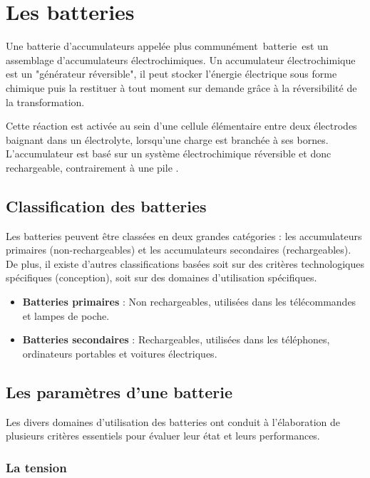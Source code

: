 \section{Les batteries}
Une batterie d'accumulateurs appelée plus communément batterie est un assemblage d'accumulateurs électrochimiques.
Un accumulateur électrochimique est un "générateur réversible", il peut stocker l'énergie électrique sous forme chimique puis la restituer à tout moment sur demande grâce à la réversibilité de la transformation.

Cette réaction est activée au sein d'une cellule élémentaire entre deux électrodes baignant dans un électrolyte, lorsqu'une charge est branchée à ses bornes.
L'accumulateur est basé sur un système électrochimique réversible et donc rechargeable, contrairement à une pile  .\\

\subsection{Classification des batteries}
Les batteries peuvent être classées en deux grandes catégories : les accumulateurs primaires (non-rechargeables) et les accumulateurs secondaires (rechargeables)\cite{l1}. De plus, il existe d'autres classifications basées soit sur des critères technologiques spécifiques (conception), soit sur des domaines d'utilisation spécifiques.

\begin{itemize}
	\item \textbf{Batteries primaires} : Non rechargeables, utilisées dans les télécommandes et lampes de poche.
	\item \textbf{Batteries secondaires} : Rechargeables, utilisées dans les téléphones, ordinateurs portables et voitures électriques.
\end{itemize}


\subsection{Les paramètres d'une batterie}

Les divers domaines d'utilisation des batteries ont conduit à l'élaboration de plusieurs critères essentiels pour évaluer leur état et leurs performances.

\subsubsection{La tension}


